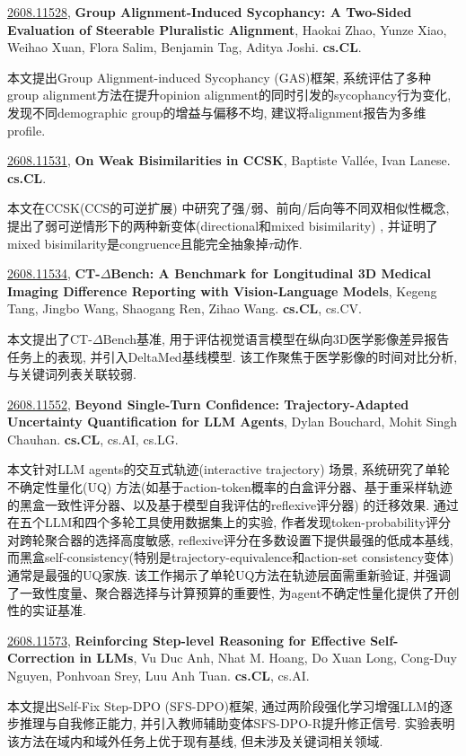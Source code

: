 \documentclass[9pt, a4paper]{article}
\theoremstyle{plain}
\theoremstyle{definition}
\theoremstyle{remark}
\newcommand{\arxivwithtarget}[3]{\hypertarget{#1}{}\href{https://arxiv.org/abs/#1}{#1}, \textbf{\textcolor{arxivblue}{#2}}, #3. }
\begin{document}
\arxivwithtarget{2608.11528}{Group Alignment-Induced Sycophancy: A Two-Sided Evaluation of Steerable Pluralistic Alignment}{Haokai Zhao, Yunze Xiao, Weihao Xuan, Flora Salim, Benjamin Tag, Aditya Joshi}\textbf{cs.CL}.

本文提出Group Alignment-induced Sycophancy (GAS)框架, 系统评估了多种group alignment方法在提升opinion alignment的同时引发的sycophancy行为变化, 发现不同demographic group的增益与偏移不均, 建议将alignment报告为多维profile.


\arxivwithtarget{2608.11531}{On Weak Bisimilarities in CCSK}{Baptiste Vallée, Ivan Lanese}\textbf{cs.CL}.

本文在CCSK(CCS的可逆扩展) 中研究了强/弱、前向/后向等不同双相似性概念, 提出了弱可逆情形下的两种新变体(directional和mixed bisimilarity) , 并证明了mixed bisimilarity是congruence且能完全抽象掉$\tau$动作.


\arxivwithtarget{2608.11534}{CT-$Δ$Bench: A Benchmark for Longitudinal 3D Medical Imaging Difference Reporting with Vision-Language Models}{Kegeng Tang, Jingbo Wang, Shaogang Ren, Zihao Wang}\textbf{cs.CL}, cs.CV.

本文提出了CT-$\Delta$Bench基准, 用于评估视觉语言模型在纵向3D医学影像差异报告任务上的表现, 并引入DeltaMed基线模型. 该工作聚焦于医学影像的时间对比分析, 与关键词列表关联较弱.


\arxivwithtarget{2608.11552}{Beyond Single-Turn Confidence: Trajectory-Adapted Uncertainty Quantification for LLM Agents}{Dylan Bouchard, Mohit Singh Chauhan}\textbf{cs.CL}, cs.AI, cs.LG.

本文针对LLM agents的交互式轨迹(interactive trajectory) 场景, 系统研究了单轮不确定性量化(UQ) 方法(如基于action-token概率的白盒评分器、基于重采样轨迹的黑盒一致性评分器、以及基于模型自我评估的reflexive评分器) 的迁移效果. 通过在五个LLM和四个多轮工具使用数据集上的实验, 作者发现token-probability评分对跨轮聚合器的选择高度敏感, reflexive评分在多数设置下提供最强的低成本基线, 而黑盒self-consistency(特别是trajectory-equivalence和action-set consistency变体) 通常是最强的UQ家族. 该工作揭示了单轮UQ方法在轨迹层面需重新验证, 并强调了一致性度量、聚合器选择与计算预算的重要性, 为agent不确定性量化提供了开创性的实证基准.


\arxivwithtarget{2608.11573}{Reinforcing Step-level Reasoning for Effective Self-Correction in LLMs}{Vu Duc Anh, Nhat M. Hoang, Do Xuan Long, Cong-Duy Nguyen, Ponhvoan Srey, Luu Anh Tuan}\textbf{cs.CL}, cs.AI.

本文提出Self-Fix Step-DPO (SFS-DPO)框架, 通过两阶段强化学习增强LLM的逐步推理与自我修正能力, 并引入教师辅助变体SFS-DPO-R提升修正信号. 实验表明该方法在域内和域外任务上优于现有基线, 但未涉及关键词相关领域.
\end{document}
